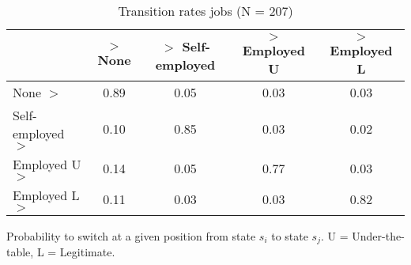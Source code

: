 \begin{table}[htp]
\footnotesize
\setlength{\tabcolsep}{10pt}
\renewcommand{\arraystretch}{1.3}
\begin{threeparttable}
\centering
\caption{Transition rates jobs (N = 207)} 
\label{tab:transition_rates_jobs}
\begin{tabular}{lcccc}
  \hline
 & $>$ None & $>$ Self-employed & $>$ Employed U & $>$ Employed L \\ 
  \hline
None $>$ & 0.89 & 0.05 & 0.03 & 0.03 \\ 
  Self-employed $>$ & 0.10 & 0.85 & 0.03 & 0.02 \\ 
  Employed U $>$ & 0.14 & 0.05 & 0.77 & 0.03 \\ 
  Employed L $>$ & 0.11 & 0.03 & 0.03 & 0.82 \\ 
   \hline
\end{tabular}
\begin{tablenotes}
\scriptsize
\item Probability to switch at a given position from state $s_i$ to state $s_j$. U = Under-the-table, L = Legitimate.
\end{tablenotes}
\end{threeparttable}
\end{table}
